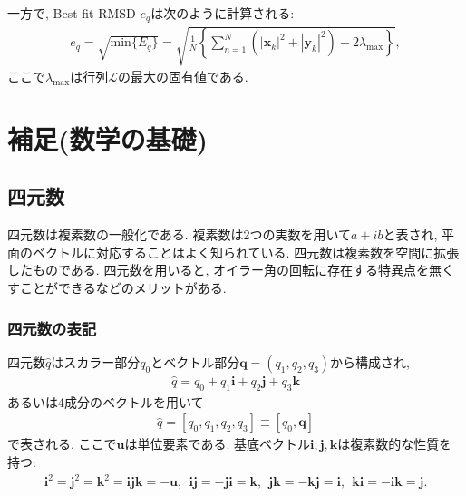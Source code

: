 一方で, Best-fit RMSD $e_{q}$は次のように計算される:
\begin{align}
  e_{q} 
=
 \sqrt{\mathrm{min} \{E_{q}\}}
=
 \sqrt{\frac{1}{N}
       \left\{
         \sum_{n=1}^{N} (|\mathbf{x}_{k}|^{2} + |\mathbf{y}_{k}|^{2})
         - 2\lambda_{\mathrm{max}}
       \right\}
       },
\end{align}
ここで$\lambda_{\mathrm{max}}$は行列$\mathcal{L}$の最大の固有値である.


\clearpage
\section{補足(数学の基礎)}
\subsection{四元数\cite{2007Hori, 2008Dunn, 2007Yabe, 2004Coutsias, 2007Karney, 2019Coutsias}} 
四元数は複素数の一般化である.
複素数は2つの実数を用いて$a+ib$と表され, 平面のベクトルに対応することはよく知られている.
四元数は複素数を空間に拡張したものである.
四元数を用いると, オイラー角の回転に存在する特異点を無くすことができるなどのメリットがある.

\subsubsection{四元数の表記}
四元数$\hat{q}$はスカラー部分$q_{0}$とベクトル部分$\mathbf{q} = (q_{1}, q_{2}, q_{3})$から構成され,
\begin{align}
 \hat{q} 
 = q_{0}
 + q_{1} \mathbf{i}
 + q_{2} \mathbf{j}
 + q_{3} \mathbf{k}
\end{align}
あるいは4成分のベクトルを用いて
\begin{align}
\hat{q}=[q_{0}, q_{1}, q_{2}, q_{3}] \equiv [q_{0}, \mathbf{q}]
\end{align}
で表される. ここで$\mathbf{u}$は単位要素である. 
基底ベクトル$\mathbf{i}, \mathbf{j}, \mathbf{k}$は複素数的な性質を持つ:
\begin{align}
 \mathbf{i}^{2} = \mathbf{j}^{2} = \mathbf{k}^{2} = \mathbf{ijk} =- \mathbf{u},~~
 \mathbf{ij} =  -\mathbf{ji}  = \mathbf{k},~~
 \mathbf{jk} =  -\mathbf{kj}  = \mathbf{i},~~
 \mathbf{ki} =  -\mathbf{ik}  = \mathbf{j}.
\end{align}


